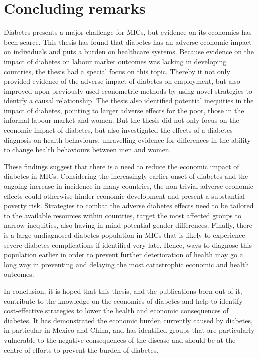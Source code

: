 \section{Concluding remarks}

Diabetes presents a major challenge for \acp{MIC}, but evidence on its economics has been scarce. This thesis has found that diabetes has an adverse economic impact on individuals and puts a burden on healthcare systems. Because evidence on the impact of diabetes on labour market outcomes was lacking in developing countries, the thesis had a special focus on this topic. Thereby it not only provided evidence of the adverse impact of diabetes on employment, but also improved upon previously used econometric methods by using novel strategies to identify a causal relationship. The thesis also identified potential inequities in the impact of diabetes, pointing to larger adverse effects for the poor, those in the informal labour market and women. But the thesis did not only focus on the economic impact of diabetes, but also investigated the effects of a diabetes diagnosis on health behaviours, unravelling evidence for differences in the ability to change health behaviours between men and women.

These findings suggest that there is a need to reduce the economic impact of diabetes in \acp{MIC}. Considering the increasingly earlier onset of diabetes and the ongoing increase in incidence in many countries, the non-trivial adverse economic effects could otherwise hinder economic development and present a substantial poverty risk. Strategies to combat the adverse diabetes effects need to be tailored to the available resources within countries, target the most affected groups to narrow inequities, also having in mind potential gender differences. Finally, there is a large undiagnosed diabetes population in \acp{MIC} that is likely to experience severe diabetes complications if identified very late. Hence, ways to diagnose this population earlier in order to prevent further deterioration of health may go a long way in preventing and delaying the most catastrophic economic and health outcomes.

In conclusion, it is hoped that this thesis, and the publications born out of it, contribute to the knowledge on the economics of diabetes and help to identify cost-effective strategies to lower the health and economic consequences of diabetes. It has demonstrated the economic burden currently caused by diabetes, in particular in Mexico and China, and has identified groups that are particularly vulnerable to the negative consequences of the disease and should be at the centre of efforts to prevent the burden of diabetes.